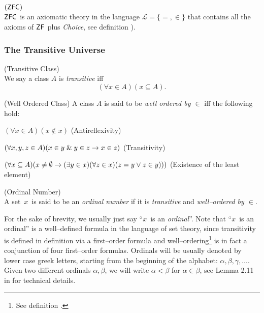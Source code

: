 \begin{definition}{$(\sf{ZFC})$}\label{def:zfc}\\ %
$\sf{ZFC}$ is an axiomatic theory in the language $\mathscr{L} = \{=, \in\}$ that contains all the axioms of $\sf{ZF}$ plus \emph{Choice}, see definition ).
\end{definition}

\subsubsection{The Transitive Universe}
\begin{definition}{(Transitive Class)}\label{def:transitivity}\\ %
We say a class $A$ is \emph{transitive} iff
\begin{equation}
(\forall x \in A)(x \subseteq A)\mbox{.}
\end{equation}
\end{definition}

\begin{definition}{(Well Ordered Class)}\label{def:well_ordering} %
A class $A$ is said to be \emph{well ordered by $\in$} iff the following hold:
\bce[(i)]
\item $(\forall x \in A)(x \not\in x)$ (Antireflexivity)
\item $(\forall x, y, z \in A)(x \in y \mathrel{\&} y \in z \rightarrow x \in z)$ (Transitivity)
\item $(\forall x \subseteq A)(x \neq \emptyset \rightarrow (\exists y \in x)(\forall z \in x)(z = y \lor z \in y)))$ (Existence of the least element)
\ece
\end{definition}

\begin{definition}{(Ordinal Number)}\label{def:ordinal}\\ %
A set~$x$~is said to be an \emph{ordinal number} if it is \emph{transitive} and \emph{well–ordered by $\in$}. 
\end{definition}
For the sake of brevity, we usually just say ``$x$~is an \emph{ordinal}''. 
Note that ``$x$~is an ordinal'' is a well–defined formula in the language of set theory, 
since transitivity is defined in definition  via a first–order formula and well–ordering\footnote{See definition .} is in fact a conjunction of four first–order formulas.
Ordinals will be usually denoted by lower case greek letters, starting from the beginning of the alphabet: $\alpha, \beta, \gamma, \ldots$.
Given two different ordinals $\alpha, \beta$, we will write $\alpha < \beta$ for $\alpha \in \beta$, see Lemma 2.11 in \cite{JechBook} for technical details.

